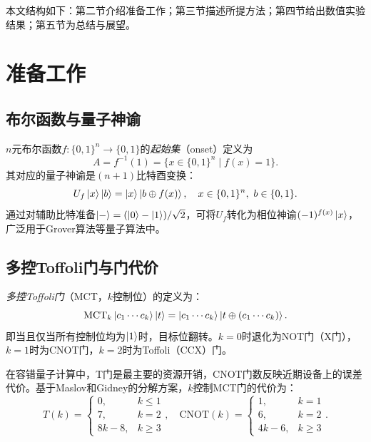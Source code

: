 \documentclass[10.5pt,compsoc,UTF8]{CjC}
\theoremstyle{mystyle}
\begin{document}
本文结构如下：第二节介绍准备工作；第三节描述所提方法；第四节给出数值实验结果；第五节为总结与展望。


\section{\heiti 准备工作}

\subsection{\heiti 布尔函数与量子神谕}

$n$元布尔函数$f:\{0,1\}^n\to\{0,1\}$的\emph{起始集}（onset）定义为
\begin{equation}
    A = f^{-1}(1) = \{x\in\{0,1\}^n \mid f(x)=1\}.
\end{equation}
其对应的量子神谕是$(n+1)$比特酉变换：
\begin{equation}
    U_f\ket{x}\ket{b} = \ket{x}\ket{b\oplus f(x)}, \quad x\in\{0,1\}^n,\ b\in\{0,1\}.
\end{equation}
通过对辅助比特准备$\ket{-}=(\ket{0}-\ket{1})/\sqrt{2}$，可将$U_f$转化为相位神谕$(-1)^{f(x)}\ket{x}$，广泛用于Grover算法等量子算法中。

\subsection{\heiti 多控Toffoli门与门代价}

\emph{多控Toffoli门}（MCT，$k$控制位）的定义为：
\begin{equation}
    \text{MCT}_k\ket{c_1\cdots c_k}\ket{t} = \ket{c_1\cdots c_k}\ket{t\oplus(c_1\cdots c_k)}.
\end{equation}
即当且仅当所有控制位均为$\ket{1}$时，目标位翻转。$k=0$时退化为NOT门（X门），$k=1$时为CNOT门，$k=2$时为Toffoli（CCX）门。

在容错量子计算中，T门是最主要的资源开销，CNOT门数反映近期设备上的误差代价。基于Maslov\cite{maslov2016advantages}和Gidney\cite{Gidney2015}的分解方案，$k$控制MCT门的代价为：
\begin{equation}
    T(k) = \begin{cases} 0, & k\le 1\\ 7, & k=2\\ 8k-8, & k\ge 3 \end{cases},
    \quad
    \text{CNOT}(k) = \begin{cases} 1, & k=1\\ 6, & k=2\\ 4k-6, & k\ge 3 \end{cases}.
\end{equation}
\end{document}
